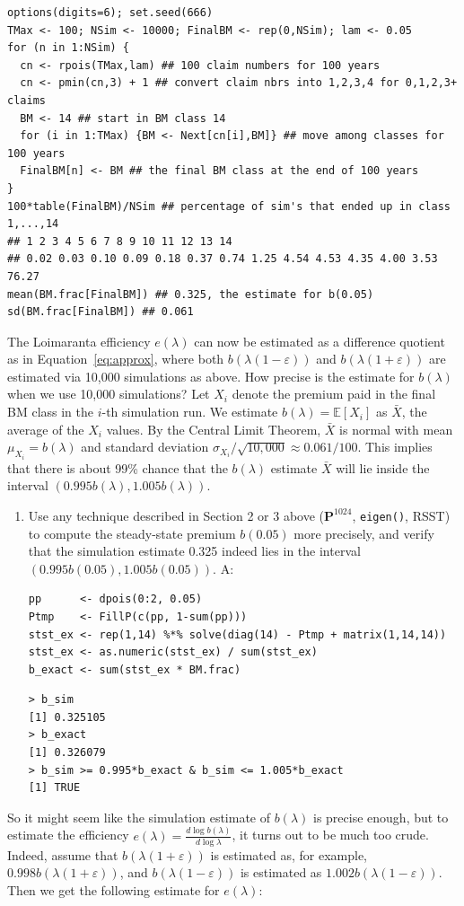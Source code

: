 \documentclass{article}
\begin{document}
\begin{lstlisting}
options(digits=6); set.seed(666)
TMax <- 100; NSim <- 10000; FinalBM <- rep(0,NSim); lam <- 0.05
for (n in 1:NSim) {
  cn <- rpois(TMax,lam) ## 100 claim numbers for 100 years
  cn <- pmin(cn,3) + 1 ## convert claim nbrs into 1,2,3,4 for 0,1,2,3+ claims
  BM <- 14 ## start in BM class 14
  for (i in 1:TMax) {BM <- Next[cn[i],BM]} ## move among classes for 100 years
  FinalBM[n] <- BM ## the final BM class at the end of 100 years
}
100*table(FinalBM)/NSim ## percentage of sim's that ended up in class 1,...,14
## 1 2 3 4 5 6 7 8 9 10 11 12 13 14
## 0.02 0.03 0.10 0.09 0.18 0.37 0.74 1.25 4.54 4.53 4.35 4.00 3.53 76.27
mean(BM.frac[FinalBM]) ## 0.325, the estimate for b(0.05)
sd(BM.frac[FinalBM]) ## 0.061
\end{lstlisting}
The Loimaranta efficiency $e(\lambda)$ can now be estimated as a difference quotient as in Equation~\ref{eq:approx}, where both $b(\lambda(1 - \varepsilon))$ and $b(\lambda(1 + \varepsilon))$ are estimated via 10,000 simulations as above. \newline
How precise is the estimate for $b(\lambda)$ when we use 10,000 simulations? Let $X_i$ denote the premium paid in the final BM class in the $i$-th simulation run. We estimate $b(\lambda) = \mathbb{E}[X_i]$ as $\bar{X}$, the average of the $X_i$ values. By the Central Limit Theorem, $\bar{X}$ is normal with mean $\mu_{X_i} = b(\lambda)$ and standard deviation $\sigma_{X_i}/\sqrt{10,000} \approx 0.061/100$. This implies that there is about 99\% chance that the $b(\lambda)$ estimate $\bar{X}$ will lie inside the interval $(0.995 b(\lambda), 1.005 b(\lambda))$.
\clearpage
\begin{enumerate}
  \item [$\boldsymbol{Q}_5$] Use any technique described in Section 2 or 3 above ($\mathbf{P}^{1024}$, \texttt{eigen()}, RSST) to compute the steady-state premium $b(0.05)$ more precisely, and verify that the simulation estimate 0.325 indeed lies in the interval $(0.995 b(0.05), 1.005 b(0.05))$. \newline
  A:
\begin{lstlisting}
pp      <- dpois(0:2, 0.05)
Ptmp    <- FillP(c(pp, 1-sum(pp)))
stst_ex <- rep(1,14) %*% solve(diag(14) - Ptmp + matrix(1,14,14))
stst_ex <- as.numeric(stst_ex) / sum(stst_ex)
b_exact <- sum(stst_ex * BM.frac)
\end{lstlisting}
\begin{lstlisting}
> b_sim
[1] 0.325105
> b_exact
[1] 0.326079
> b_sim >= 0.995*b_exact & b_sim <= 1.005*b_exact
[1] TRUE
\end{lstlisting}
\end{enumerate}
\clearpage
So it might seem like the simulation estimate of $b(\lambda)$ is precise enough, but to estimate the efficiency $e(\lambda) = \frac{d \log b(\lambda)}{d \log \lambda}$, it turns out to be much too crude. Indeed, assume that $b(\lambda(1+\varepsilon))$ is estimated as, for example, $0.998 b(\lambda(1 +\varepsilon))$, and $b(\lambda(1-\varepsilon))$ is estimated as $1.002 b(\lambda(1-\varepsilon))$. Then we get the following estimate for $e(\lambda)$:
 
\end{document}

